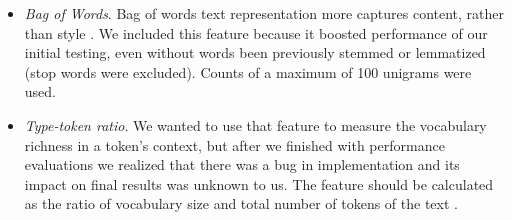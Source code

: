 \documentclass[10pt, a4paper]{article}
\begin{document}
\begin{itemize}
	\item \emph{Bag of Words}. Bag of words text representation more captures content, rather than style \citep{stamatatos-2009a}. We included this feature because it boosted performance of our initial testing, even without words been previously stemmed or lemmatized (stop words were excluded). Counts of a maximum of 100 unigrams were used.
	\item \emph{Type-token ratio}. We wanted to use that feature to measure the vocabulary richness in a token's context, but after we finished with performance evaluations we realized that there was a bug in implementation and its impact on final results was unknown to us. The feature should be calculated as the ratio of vocabulary size and total number of tokens of the text \citep{stamatatos-2009a}.
\end{itemize}

\end{document}
